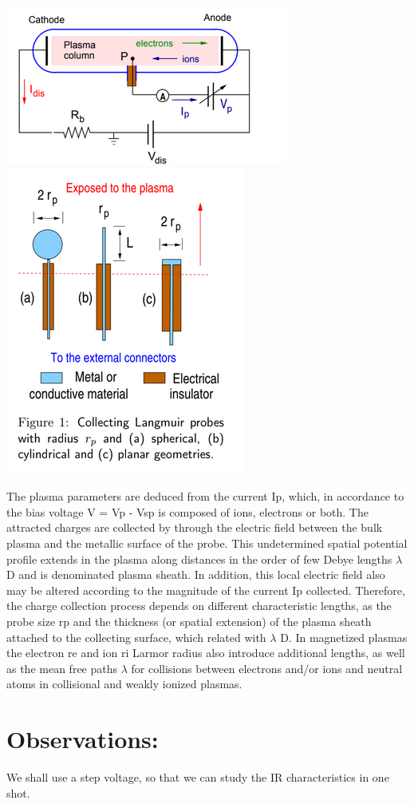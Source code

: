 \documentclass[]{report}[12 pt]
\begin{document}
\begin{center}
	\includegraphics{lp1.png}\\
	\includegraphics[width=6 cm]{lp2.png}
\end{center}
The plasma parameters are deduced from the current Ip, which, in accordance to the bias voltage V = Vp - Vsp is composed of ions, electrons or both. The attracted charges are collected by through the electric field between the bulk plasma and the metallic surface of the probe. This undetermined spatial potential profile extends in the plasma along distances in the order of few Debye lengths $\lambda$ D and is denominated plasma sheath. In
addition, this local electric field also may be altered according to the magnitude of the current Ip collected.
Therefore, the charge collection process depends on different characteristic lengths, as the probe size rp and the thickness (or spatial extension) of the plasma sheath attached to the collecting surface, which related with $\lambda$ D. In magnetized plasmas the electron re and ion ri Larmor radius also introduce additional lengths, as well as the mean free paths $\lambda$ for collisions between electrons and/or ions and neutral atoms
in collisional and weakly ionized plasmas.
\section*{Observations:}
We shall use a step voltage, so that we can study the IR characteristics in one shot.
\end{document}
